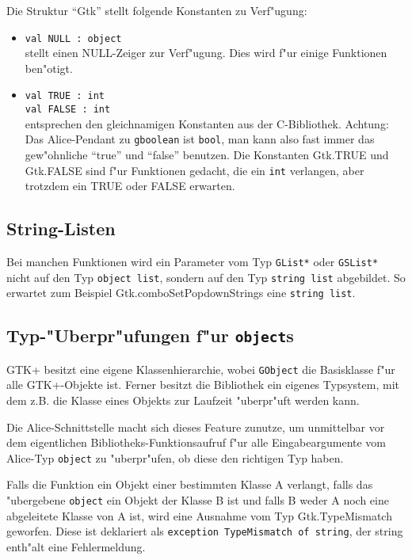 \documentclass{article}
\begin{document}
Die Struktur ``Gtk'' stellt folgende Konstanten zu Verf"ugung:
\begin{itemize}
\item \texttt{val NULL : object}\\
      stellt einen NULL-Zeiger zur Verf"ugung. Dies wird f"ur einige Funktionen
      ben"otigt.
\item \texttt{val TRUE : int}\\
      \texttt{val FALSE : int}\\
      entsprechen den gleichnamigen Konstanten aus der C-Bibliothek.
      Achtung: Das Alice-Pendant zu \texttt{gboolean} ist \texttt{bool}, man
      kann also fast immer das gew"ohnliche ``true'' und ``false'' benutzen.
      Die Konstanten Gtk.TRUE und Gtk.FALSE sind f"ur Funktionen gedacht, die
      ein \texttt{int} verlangen, aber trotzdem ein TRUE oder FALSE erwarten.
\end{itemize}

\subsection{String-Listen}

Bei manchen Funktionen wird ein Parameter vom Typ \texttt{GList*} oder 
\texttt{GSList*} nicht auf den Typ \texttt{object list}, sondern auf den Typ
\texttt{string list} abgebildet.
So erwartet zum Beispiel Gtk.comboSetPopdownStrings eine \texttt{string list}.

\subsection{Typ-"Uberpr"ufungen f"ur \texttt{object}s}

GTK+ besitzt eine eigene Klassenhierarchie, wobei \texttt{GObject} die
Basisklasse f"ur alle GTK+-Objekte ist. Ferner besitzt die Bibliothek ein
eigenes Typsystem, mit dem z.B. die Klasse eines Objekts zur Laufzeit 
"uberpr"uft werden kann. 

Die Alice-Schnittstelle macht sich dieses Feature zunutze, um
unmittelbar vor dem eigentlichen Bibliotheks-Funktionsaufruf f"ur alle
Eingabeargumente vom Alice-Typ \texttt{object} zu "uberpr"ufen, ob diese den
richtigen Typ haben. 

Falls die Funktion ein Objekt einer bestimmten Klasse A
verlangt, falls das "ubergebene \texttt{object} ein Objekt der Klasse B ist
und falls B weder A noch eine abgeleitete Klasse von A ist, wird eine Ausnahme
vom Typ Gtk.TypeMismatch geworfen. Diese ist deklariert als
\texttt{exception TypeMismatch of string},
der string enth"alt eine Fehlermeldung.
\end{document}

